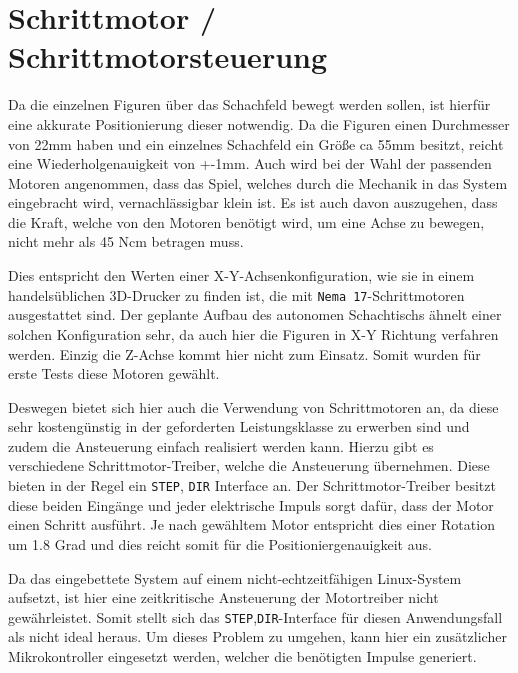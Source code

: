 \hypertarget{schrittmotor-schrittmotorsteuerung}{%
\section{Schrittmotor /
Schrittmotorsteuerung}\label{schrittmotor-schrittmotorsteuerung}}

Da die einzelnen Figuren über das Schachfeld bewegt werden sollen, ist
hierfür eine akkurate Positionierung dieser notwendig. Da die Figuren
einen Durchmesser von 22mm haben und ein einzelnes Schachfeld ein Größe
ca 55mm besitzt, reicht eine Wiederholgenauigkeit von +-1mm. Auch wird
bei der Wahl der passenden Motoren angenommen, dass das Spiel, welches
durch die Mechanik in das System eingebracht wird, vernachlässigbar
klein ist. Es ist auch davon auszugehen, dass die Kraft, welche von den
Motoren benötigt wird, um eine Achse zu bewegen, nicht mehr als 45 Ncm
betragen muss.

Dies entspricht den Werten einer X-Y-Achsenkonfiguration, wie sie in
einem handelsüblichen 3D-Drucker zu finden ist, die mit
\passthrough{\lstinline!Nema 17!}-Schrittmotoren ausgestattet sind. Der
geplante Aufbau des autonomen Schachtischs ähnelt einer solchen
Konfiguration sehr, da auch hier die Figuren in X-Y Richtung verfahren
werden. Einzig die Z-Achse kommt hier nicht zum Einsatz. Somit wurden
für erste Tests diese Motoren gewählt.

Deswegen bietet sich hier auch die Verwendung von Schrittmotoren an, da
diese sehr kostengünstig in der geforderten Leistungsklasse zu erwerben
sind und zudem die Ansteuerung einfach realisiert werden kann. Hierzu
gibt es verschiedene Schrittmotor-Treiber, welche die Ansteuerung
übernehmen. Diese bieten in der Regel ein
\passthrough{\lstinline!STEP!}, \passthrough{\lstinline!DIR!} Interface
an. Der Schrittmotor-Treiber besitzt diese beiden Eingänge und jeder
elektrische Impuls sorgt dafür, dass der Motor einen Schritt ausführt.
Je nach gewähltem Motor entspricht dies einer Rotation um 1.8 Grad und
dies reicht somit für die Positioniergenauigkeit aus.

Da das eingebettete System auf einem nicht-echtzeitfähigen Linux-System
aufsetzt, ist hier eine zeitkritische Ansteuerung der Motortreiber nicht
gewährleistet. Somit stellt sich das
\passthrough{\lstinline!STEP!},\passthrough{\lstinline!DIR!}-Interface
für diesen Anwendungsfall als nicht ideal heraus. Um dieses Problem zu
umgehen, kann hier ein zusätzlicher Mikrokontroller eingesetzt werden,
welcher die benötigten Impulse generiert.

